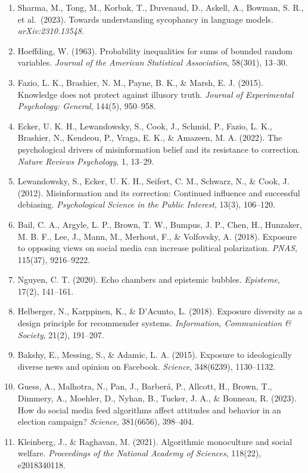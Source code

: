 \documentclass[
  11pt]{article}
\begin{document}
\begin{enumerate}
\item
  Sharma, M., Tong, M., Korbak, T., Duvenaud, D., Askell, A., Bowman, S. R., et al.~(2023). Towards understanding sycophancy in language models. \emph{arXiv:2310.13548}.
\item
  Hoeffding, W. (1963). Probability inequalities for sums of bounded random variables. \emph{Journal of the American Statistical Association}, 58(301), 13--30.
\item
  Fazio, L. K., Brashier, N. M., Payne, B. K., \& Marsh, E. J. (2015). Knowledge does not protect against illusory truth. \emph{Journal of Experimental Psychology: General}, 144(5), 950--958.
\item
  Ecker, U. K. H., Lewandowsky, S., Cook, J., Schmid, P., Fazio, L. K., Brashier, N., Kendeou, P., Vraga, E. K., \& Amazeen, M. A. (2022). The psychological drivers of misinformation belief and its resistance to correction. \emph{Nature Reviews Psychology}, 1, 13--29.
\item
  Lewandowsky, S., Ecker, U. K. H., Seifert, C. M., Schwarz, N., \& Cook, J. (2012). Misinformation and its correction: Continued influence and successful debiasing. \emph{Psychological Science in the Public Interest}, 13(3), 106--120.
\item
  Bail, C. A., Argyle, L. P., Brown, T. W., Bumpus, J. P., Chen, H., Hunzaker, M. B. F., Lee, J., Mann, M., Merhout, F., \& Volfovsky, A. (2018). Exposure to opposing views on social media can increase political polarization. \emph{PNAS}, 115(37), 9216--9222.
\item
  Nguyen, C. T. (2020). Echo chambers and epistemic bubbles. \emph{Episteme}, 17(2), 141--161.
\item
  Helberger, N., Karppinen, K., \& D'Acunto, L. (2018). Exposure diversity as a design principle for recommender systems. \emph{Information, Communication \& Society}, 21(2), 191--207.
\item
  Bakshy, E., Messing, S., \& Adamic, L. A. (2015). Exposure to ideologically diverse news and opinion on Facebook. \emph{Science}, 348(6239), 1130--1132.
\item
  Guess, A., Malhotra, N., Pan, J., Barberá, P., Allcott, H., Brown, T., Dimmery, A., Moehler, D., Nyhan, B., Tucker, J. A., \& Bonneau, R. (2023). How do social media feed algorithms affect attitudes and behavior in an election campaign? \emph{Science}, 381(6656), 398--404.
\item
  Kleinberg, J., \& Raghavan, M. (2021). Algorithmic monoculture and social welfare. \emph{Proceedings of the National Academy of Sciences}, 118(22), e2018340118.

\end{enumerate}
\end{document}
